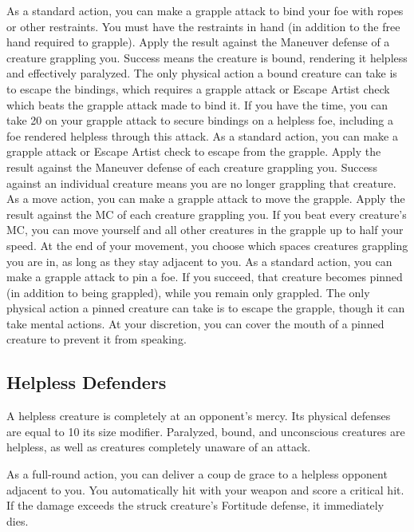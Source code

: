  As a standard action, you can make a grapple attack to bind your foe with ropes or other restraints. You must have the restraints in hand (in addition to the free hand required to grapple). Apply the result against the Maneuver defense of a creature grappling you. Success means the creature is bound, rendering it helpless and effectively paralyzed. The only physical action a bound creature can take is to escape the bindings, which requires a grapple attack or Escape Artist check which beats the grapple attack made to bind it. If you have the time, you can take 20 on your grapple attack to secure bindings on a helpless foe, including a foe rendered helpless through this attack.
 As a standard action, you can make a grapple attack or Escape Artist check to escape from the grapple. Apply the result against the Maneuver defense of each creature grappling you. Success against an individual creature means you are no longer grappling that creature.
 As a move action, you can make a grapple attack to move the grapple. Apply the result against the MC of each creature grappling you. If you beat every creature's MC, you can move yourself and all other creatures in the grapple up to half your speed. At the end of your movement, you choose which spaces creatures grappling you are in, as long as they stay adjacent to you.
 As a standard action, you can make a grapple attack to pin a foe. If you succeed, that creature becomes pinned (in addition to being grappled), while you remain only grappled. The only physical action a pinned creature can take is to escape the grapple, though it can take mental actions. At your discretion, you can cover the mouth of a pinned creature to prevent it from speaking. 

\subsection{Helpless Defenders}
A helpless creature is completely at an opponent's mercy. Its physical defenses are equal to 10 \add its size modifier. Paralyzed, bound, and unconscious creatures are helpless, as well as creatures completely unaware of an attack.

\label{Coup de Grace} As a full-round action, you can deliver a coup de grace to a helpless opponent adjacent to you. You automatically hit with your weapon and score a critical hit. If the damage exceeds the struck creature's Fortitude defense, it immediately dies.

